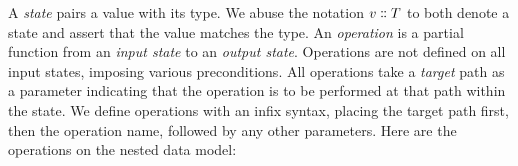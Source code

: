\documentclass[english,submission]{programming}
\theoremstyle{definition}
\newcommand{\mathbox}[1]{\colorbox{black!10}{$#1$}}
\newcommand{\isa}{\dblcolon}
\begin{document}
A \textit{state} pairs a value with its type. We abuse the notation \mathbox{v \isa T} to both denote a state and assert that the value matches the type.
An \textit{operation} is a partial function from an \textit{input state} to an \textit{output state}. Operations are not defined on all input states, imposing various preconditions.
All operations take a \textit{target} path as a parameter indicating that the operation is to be performed at that path within the state.
We define operations with an infix syntax, placing the target path first, then the operation name, followed by any other parameters. Here are the operations on the nested data model:

\end{document}
